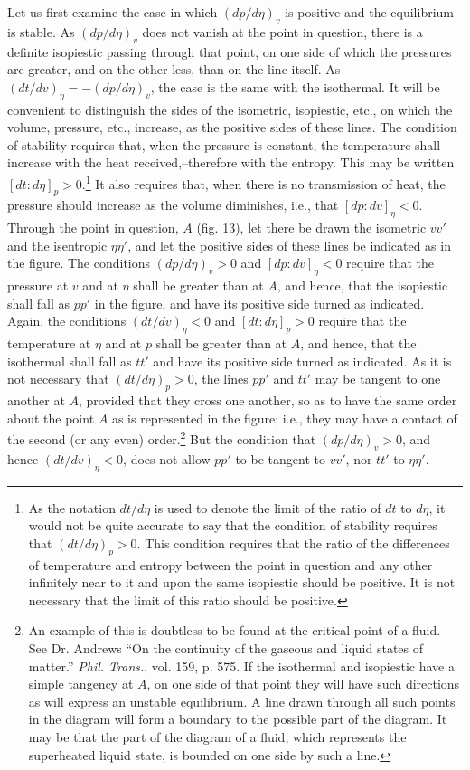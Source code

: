 \documentclass[11pt]{article}
\begin{document}
Let us first examine the case in which $\left(dp/d\eta\right)_v$ is positive and the equilibrium is stable. As $\left(dp/d\eta\right)_v$ does not vanish at the point in question, there is a definite isopiestic passing through that point, on one side of which the pressures are greater, and on the other less, than on the line itself. As $\left(dt/dv\right)_\eta=-\left(dp/d\eta\right)_v$, the case is the same with the isothermal. It will be convenient to distinguish the sides of the isometric, isopiestic, etc., on which the volume, pressure, etc., increase, as the positive sides of these lines. The condition of stability requires that, when the pressure is constant, the temperature shall increase with the heat received,--therefore with the entropy. This may be written $[dt:d\eta]_p>0$.\footnote{As the notation $dt/d\eta$ is used to denote the limit of the ratio of $dt$ to $d\eta$, it would not be quite accurate to say that the condition of stability requires that $\left(dt/d\eta\right)_p>0$. This condition requires that the ratio of the differences of temperature and entropy between the point in question and any other infinitely near to it and upon the same isopiestic should be positive. It is not necessary that the limit of this ratio should be positive.} It also requires that, when there is no transmission of heat, the pressure should increase as the volume diminishes, i.e., that $[dp:dv]_\eta<0$. Through the point in question, $A$ (fig. 13), let there be drawn the isometric $vv'$ and the isentropic $\eta\eta'$, and let the positive sides of these lines be indicated as in the figure. The conditions $\left(dp/d\eta\right)_v>0$ and $[dp:dv]_\eta<0$ require that the pressure at $v$ and at $\eta$ shall be greater than at $A$, and hence, that the isopiestic shall fall as $pp'$ in the figure, and have its positive side turned as indicated. Again, the conditions $\left(dt/dv\right)_\eta<0$ and $[dt:d\eta]_p>0$ require that the temperature at $\eta$ and at $p$ shall be greater than at $A$, and hence, that the isothermal shall fall as $tt'$ and have its positive side turned as indicated. As it is not necessary that $\left(dt/d\eta\right)_p>0$, the lines $pp'$ and $tt'$ may be tangent to one another at $A$, provided that they cross one another, so as to have the same order about the point $A$ as is represented in the figure; i.e., they may have a contact of the second (or any even) order.\footnote{An example of this is doubtless to be found at the critical point of a fluid. See Dr. Andrews ``On the continuity of the gaseous and liquid states of matter.'' \emph{Phil. Trans.}, vol. 159, p. 575. If the isothermal and isopiestic have a simple tangency at $A$, on one side of that point they will have such directions as will express an unstable equilibrium. A line drawn through all such points in the diagram will form a boundary to the possible part of the diagram. It may be that the part of the diagram of a fluid, which represents the superheated liquid state, is bounded on one side by such a line.} But the condition that $\left(dp/d\eta\right)_v>0$, and hence $\left(dt/dv\right)_\eta<0$, does not allow $pp'$ to be tangent to $vv'$, nor $tt'$ to $\eta\eta'$.
\end{document}
